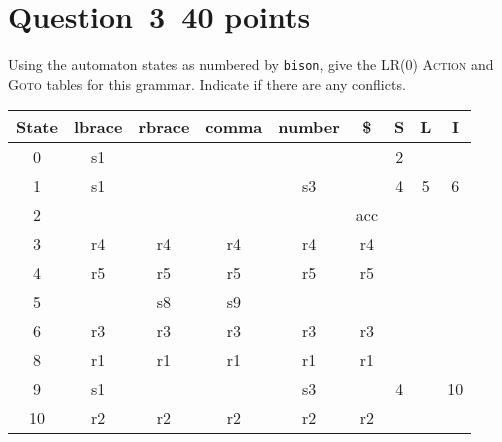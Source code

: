 \documentclass[10pt]{article}
\begin{document}
\begin{framed}
\end{framed}
\newpage
\section*{Question~3~\hfill 40 points}

Using the automaton states as numbered by {\tt bison},
give the LR(0) \textsc{Action} and \textsc{Goto} tables
for this grammar.
Indicate if there are any conflicts.

\begin{framed}
  \centering
  \begin{tabular}{c|ccccc|ccc}
    \toprule
    State & lbrace & rbrace & comma  & number & \$    & S      & L      & I  \\
    \midrule
    0     & s1     &        &        &        &       & 2      &        &    \\
    1     & s1     &        &        & s3     &       & 4      & 5      & 6  \\
    2     &        &        &        &        & acc   &        &        &    \\
    3     & r4     & r4     & r4     & r4     & r4    &        &        &    \\
    4     & r5     & r5     & r5     & r5     & r5    &        &        &    \\
    5     &        & s8     & s9     &        &       &        &        &    \\
    6     & r3     & r3     & r3     & r3     & r3    &        &        &    \\
    8     & r1     & r1     & r1     & r1     & r1    &        &        &    \\
    9     & s1     &        &        & s3     &       & 4      &        & 10 \\
    10    & r2     & r2     & r2     & r2     & r2    &        &        &    \\
    \bottomrule
  \end{tabular}
\end{framed}
\end{document}
